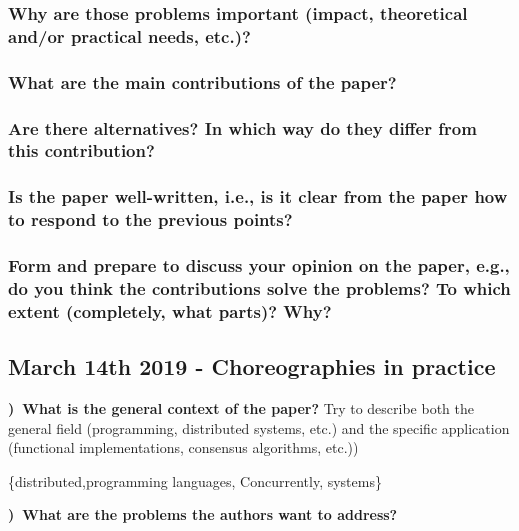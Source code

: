 \documentclass[a4paper,10pt,titlepage]{report}
\begin{document}
\subsubsection{Why are those problems important (impact, theoretical and/or
practical needs, etc.)?}



\subsubsection{What are the main contributions of the paper?}



\subsubsection{Are there alternatives? In which way do they differ from this
contribution?}



\subsubsection{Is the paper well-written, i.e., is it clear from the paper how
to respond to the previous points?}	



\subsubsection{Form and prepare to discuss your opinion on the paper, e.g., do
you think the contributions solve the problems? To which extent (completely,
what parts)? Why?}
	
	\newpage
\subsection{March 14th 2019 - Choreographies in practice}

\newcommand{\itemTitle}{)\ }

\textbf{\itemTitle What is the general context of the paper?} 
Try to describe both the general field (programming, distributed systems,
etc.) and the specific application (functional implementations, consensus
algorithms, etc.))

\{distributed,programming languages, Concurrently, systems\}
	\vspace{5mm}
	
\textbf{\itemTitle What are the problems the authors want to address?}
\end{document}
